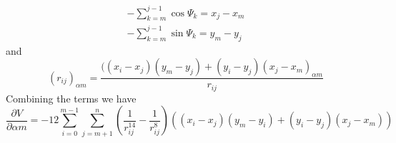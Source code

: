 \documentclass[conference,letterpaper]{IEEEtran}
\begin{document}
\begin{equation}
    \begin{split}
        -\sum_{k=m}^{j-1}\cos{\Psi_{k}}=x_{j}-x_{m} \\
        -\sum_{k=m}^{j-1}\sin{\Psi_{k}}=y_{m}-y_{j}
    \end{split}
\end{equation}
and
\begin{equation}
    (r_{ij})_{\alpha m} = \frac{((x_{i} - x_{j})(y_{m} - y_{j}) + (y_{i} - y_{j})(x_{j} - x_{m})_{\alpha m}}{r_{ij}}
\end{equation}
Combining the terms we have
\begin{equation}
    \frac{\partial V}{\partial \alpha m} = -12 \sum_{i=0}^{m-1}\sum_{j=m+1}^{n}(\frac{1}{r_{ij}^{14}} - \frac{1}{r_{ij}^{8}})((x_{i}-x_{j})(y_{m}-y_{i})+(y_{i}-y_{j})(x_{j}-x_{m}))
\end{equation}

%
%
\end{document}
